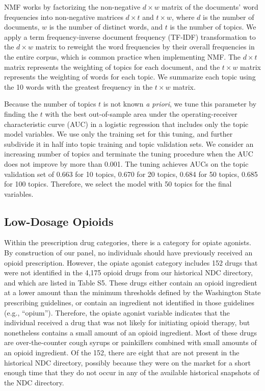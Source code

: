 \documentclass[10pt, letter]{article}
\begin{document}
NMF works by factorizing the non-negative $d \times w$ matrix of the documents' word frequencies into non-negative matrices $d \times t$ and $t \times w$, where $d$ is the number of documents, $w$ is the number of distinct words, and $t$ is the number of topics. We apply a term frequency-inverse document frequency (TF-IDF) transformation to the $d \times w$ matrix to reweight the word frequencies by their overall frequencies in the entire corpus, which is common practice when implementing NMF. The $d \times t$ matrix represents the weighting of topics for each document, and the $t \times w$ matrix represents the weighting of words for each topic. We summarize each topic using the 10 words with the greatest frequency in the $t \times w$ matrix.

Because the number of topics $t$ is not known \emph{a priori}, we tune this parameter by finding the $t$ with the best out-of-sample area under the operating-receiver characteristic curve (AUC) in a logistic regression that includes only the topic model variables. We use only the training set for this tuning, and further subdivide it in half into topic training and topic validation sets. We consider an increasing number of topics and terminate the tuning procedure when the AUC does not improve by more than 0.001. The tuning achieves AUCs on the topic validation set of 0.663 for 10 topics, 0.670 for 20 topics, 0.684 for 50 topics, 0.685 for 100 topics. Therefore, we select the model with 50 topics for the final variables.

\subsection{Low-Dosage Opioids}

Within the prescription drug categories, there is a category for opiate agonists. By construction of our panel, no individuals should have previously received an opioid prescription. However, the opiate agonist category includes 152 drugs that were not identified in the 4,175 opioid drugs from our historical NDC directory, and which are listed in Table S5. These drugs either contain an opioid ingredient at a lower amount than the minimum thresholds defined by the Washington State prescribing guidelines, or contain an ingredient not identified in those guidelines (e.g., ``opium''). Therefore, the opiate agonist variable indicates that the individual received a drug that was not likely for initiating opioid therapy, but nonetheless contains a small amount of an opioid ingredient. Most of these drugs are over-the-counter cough syrups or painkillers combined with small amounts of an opioid ingredient. Of the 152, there are eight that are not present in the historical NDC directory, possibly because they were on the market for a short enough time that they do not occur in any of the available historical snapshots of the NDC directory.
\end{document}
